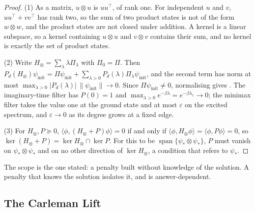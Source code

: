 \begin{proof}
(1) As a matrix, $u\otimes u$ is $uu^{\top}$, of rank one. For independent $u$ and $v$, $uu^\top+vv^\top$ has rank two, so the sum of two product states is not of the form $w\otimes w$, and the product states are not closed under addition. A kernel is a linear subspace, so a kernel containing $u\otimes u$ and $v\otimes v$ contains their sum, and no kernel is exactly the set of product states.

(2) Write $H_\otimes=\sum_\lambda\lambda\Pi_\lambda$ with $\Pi_0=\Pi$. Then $P_d(H_\otimes)\psi_{\mathrm{init}}=\Pi\psi_{\mathrm{init}}+\sum_{\lambda>0}P_d(\lambda)\Pi_\lambda\psi_{\mathrm{init}}$, and the second term has norm at most $\max_{\lambda>0}|P_d(\lambda)|\,\|\psi_{\mathrm{init}}\|\to0$. Since $\Pi\psi_{\mathrm{init}}\ne0$, normalising gives . The imaginary-time filter has $P(0)=1$ and $\max_{\lambda>0}e^{-\beta\lambda}=e^{-\beta\lambda_1}\to0$; the minimax filter takes the value one at the ground state and at most $\varepsilon$ on the excited spectrum, and $\varepsilon\to0$ as its degree grows at a fixed edge.

(3) For $H_\otimes,P\succeq0$, $\langle\phi,(H_\otimes+P)\phi\rangle=0$ if and only if $\langle\phi,H_\otimes\phi\rangle=\langle\phi,P\phi\rangle=0$, so $\ker(H_\otimes+P)=\ker H_\otimes\cap\ker P$. For this to be $\operatorname{span}\{\psi_*\otimes\psi_*\}$, $P$ must vanish on $\psi_*\otimes\psi_*$ and on no other direction of $\ker H_\otimes$, a condition that refers to $\psi_*$.
\end{proof}
The scope is the one stated: a penalty built without knowledge of the solution. A penalty that knows the solution isolates it, and is answer-dependent.

\subsection{The Carleman Lift}
\label{app:carleman-layouts}

